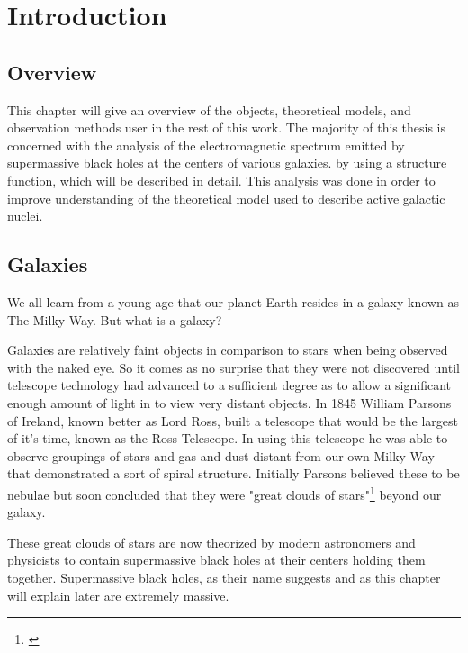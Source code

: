 \documentclass[12pt, oneside]{smuthesis}
\begin{document}
\chapter{\sc Introduction} \label{introduction}

\section{\sc Overview} \label{overview}

This chapter will give an overview of the objects, theoretical models, and observation methods user in the rest of this work. The majority of this thesis is concerned with the analysis of the electromagnetic spectrum emitted by supermassive black holes at the centers of various galaxies. by using a structure function, which will be described in detail. This analysis was done in order to improve understanding of the theoretical model used to describe active galactic nuclei.

\section{\sc Galaxies} \label{galaxies}

We all learn from a young age that our planet Earth resides in a galaxy known as The Milky Way. But what is a galaxy?

Galaxies are relatively faint objects in comparison to stars when being observed with the naked eye. So it comes as no surprise that they were not discovered until telescope technology had advanced to a sufficient degree as to allow a significant enough amount of light in to view very distant objects. In 1845 William Parsons of Ireland, known better as Lord Ross, built a telescope that would be the largest of it's time, known as the Ross Telescope. In using this telescope he was able to observe groupings of stars and gas and dust distant from our own Milky Way that demonstrated a sort of spiral structure. Initially Parsons believed these to be nebulae but soon concluded that they were "great clouds of stars"\footnote{\cite{sag}} beyond our galaxy.

These great clouds of stars are now theorized by modern astronomers and physicists to contain supermassive black holes at their centers holding them together. Supermassive black holes, as their name suggests and as this chapter will explain later are extremely massive.
\end{document}
